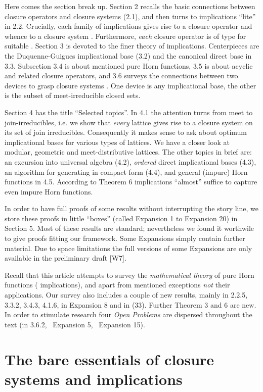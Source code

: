 \documentclass[11pt]{article}
\begin{document}
Here comes the section break up. Section 2 recalls the basic connections between closure operators  and closure systems  (2.1), and then turns to implications ``lite'' in 2.2. Crucially, each family  of implications  gives rise to a closure operator  and whence to a closure system . Furthermore, {\it each} closure operator  is of type  for suitable . Section 3 is devoted to the finer theory of implications. Centerpieces are the Duquenne-Guigues implicational base (3.2) and the canonical direct base in 3.3. Subsection 3.4 is about mentioned pure Horn functions, 3.5 is about acyclic and related closure operators, and 3.6 surveys the connections between two devices to grasp closure systems . One device is any implicational base, the other is the subset  of meet-irreducible closed sets. 

Section 4 has the title ``Selected topics''.
In 4.1 the attention turns from meet to join-irreducibles, i.e. we show that {\it every} lattice  gives rise to a closure system  on its set  of join irreducibles. Consequently it makes sense to ask about optimum implicational bases  for various types of lattices. We have a closer look at modular, geometric and meet-distributive lattices. The other topics in brief are: an excursion into universal algebra (4.2), {\it ordered} direct implicational bases (4.3), an algorithm for generating  in compact form (4.4), and general (impure) Horn functions in 4.5. According to Theorem 6 implications ``almost'' suffice to capture even impure Horn functions.


In order to have full proofs of some results without interrupting the story line, we store these proofs in little ``boxes'' (called Expansion 1 to Expansion 20) in Section 5. Most of these results are standard; nevertheless we found it worthwile to give proofs fitting our framework. Some Expansions simply contain further material. Due to space limitations the full versions of some Expansions are only available in the preliminary draft [W7].

Recall that this article attempts to survey the {\it mathematical theory} of pure Horn functions ( implications), and apart from mentioned exceptions {\it not} their applications.  Our survey also includes a couple of new results, mainly in 2.2.5, 3.3.2,  3.4.3, 4.1.6, in Expansion 8 and in (33). Further Theorem 3 and 6 are new. In order to stimulate research four {\it Open Problems} are dispersed throughout the text (in 3.6.2, \ Expansion 5, \ Expansion 15). 


\section{The bare essentials of closure systems and implications}
\end{document}

